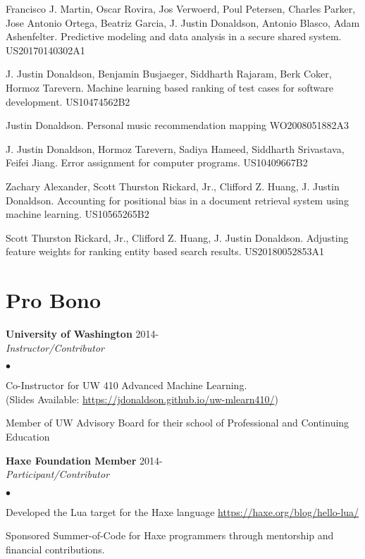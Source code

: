 \documentclass[margin,line]{res}
\newenvironment{list2}{
  \begin{list}{$\bullet$}{%
      \setlength{\itemsep}{0in}
      \setlength{\parsep}{0in} \setlength{\parskip}{0in}
      \setlength{\topsep}{0in} \setlength{\partopsep}{0in} 
      \setlength{\leftmargin}{0.2in}}}{\end{list}}
\begin{document}
\begin{resume}
Francisco J. Martin, Oscar Rovira,  Jos Verwoerd, Poul Petersen, Charles Parker, Jose Antonio Ortega, Beatriz Garcia, J. Justin Donaldson, Antonio Blasco, Adam Ashenfelter. Predictive modeling and data analysis in a secure shared system. US20170140302A1

J. Justin Donaldson, Benjamin Busjaeger, Siddharth Rajaram, Berk Coker, Hormoz Tarevern. Machine learning based ranking of test cases for software development. US10474562B2

Justin Donaldson. Personal music recommendation mapping WO2008051882A3

J. Justin Donaldson, Hormoz Tarevern, Sadiya Hameed, Siddharth Srivastava, Feifei Jiang. Error assignment for computer programs. US10409667B2

Zachary Alexander, Scott Thurston Rickard, Jr., Clifford Z. Huang, J. Justin Donaldson. Accounting for positional bias in a document retrieval system using machine learning. US10565265B2

Scott Thurston Rickard, Jr., Clifford Z. Huang, J. Justin Donaldson. Adjusting feature weights for ranking entity based search results. US20180052853A1


\section{\sc Pro Bono}

{\bf University of Washington} \hfill 2014- \\
{\em Instructor/Contributor}
\begin{list2}
  \item Co-Instructor for UW 410 Advanced Machine Learning.\\ (Slides Available: \url{https://jdonaldson.github.io/uw-mlearn410/})
  \item Member of UW Advisory Board for their school of Professional and Continuing Education
\end{list2}

{\bf Haxe Foundation Member} \hfill 2014- \\
{\em Participant/Contributor} 

\begin{list2}
  \item Developed the Lua target for the Haxe language \url{https://haxe.org/blog/hello-lua/}
  \item Sponsored Summer-of-Code for Haxe programmers through mentorship and financial contributions.
\end{list2}



\end{resume}
\end{document}
